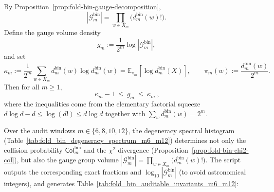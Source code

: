 \begin{proposition}\label{prop:fold-bin-gauge-volume}
By Proposition~\ref{prop:fold-bin-gauge-decomposition},
\[
|\mathcal{G}^{\mathrm{bin}}_m|
=\prod_{w\in X_m}\bigl(d^{\mathrm{bin}}_m(w)!\bigr).
\]
Define the gauge volume density
\[
g_m:=\frac{1}{2^m}\log|\mathcal{G}^{\mathrm{bin}}_m|,
\]
and set
\[
\kappa_m:=\frac{1}{2^m}\sum_{w\in X_m}d^{\mathrm{bin}}_m(w)\log d^{\mathrm{bin}}_m(w)
=\mathbb{E}_{\pi_m}[\log d^{\mathrm{bin}}_m(X)],
\qquad
\pi_m(w):=\frac{d^{\mathrm{bin}}_m(w)}{2^m}.
\]
Then for all \(m\ge 1\),
\[
\boxed{\ \kappa_m-1\ \le\ g_m\ \le\ \kappa_m\ },
\]
where the inequalities come from the elementary factorial squeeze
\(
d\log d-d\le \log(d!)\le d\log d
\)
together with \(\sum_w d^{\mathrm{bin}}_m(w)=2^m\).
\end{proposition}

\begin{remark}\label{rem:fold-bin-auditable-invariants}
Over the audit windows \(m\in\{6,8,10,12\}\), the degeneracy spectral histogram (Table~\ref{tab:fold_bin_degeneracy_spectrum_m6_m12}) determines not only the collision probability
\(\mathsf{Col}^{\mathrm{bin}}_m\) and the \(\chi^2\) divergence (Proposition~\ref{prop:fold-bin-chi2-col}), but also the gauge group volume
\(
|\mathcal{G}^{\mathrm{bin}}_m|
=\prod_{w\in X_m}\bigl(d^{\mathrm{bin}}_m(w)!\bigr)
\).
The script \texttt{} outputs the corresponding exact fractions and \(\log_{10}|\mathcal{G}^{\mathrm{bin}}_m|\) (to avoid astronomical integers), and generates Table~\ref{tab:fold_bin_auditable_invariants_m6_m12}:

\end{remark}

